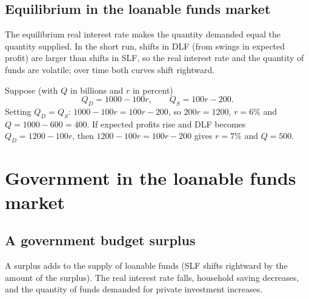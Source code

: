 \subsection{Equilibrium in the loanable funds market}

The equilibrium real interest rate makes the quantity demanded equal the quantity
supplied. In the short run, shifts in DLF (from swings in expected profit) are larger
than shifts in SLF, so the real interest rate and the quantity of funds are volatile; over
time both curves shift rightward.

\begin{example}
Suppose (with $Q$ in billions and $r$ in percent)
\[
  Q_D = 1000 - 100r, \qquad Q_S = 100r - 200.
\]
Setting $Q_D = Q_S$: $1000 - 100r = 100r - 200$, so $200r = 1200$, $r = 6\%$ and
$Q = 1000 - 600 = 400$. If expected profits rise and DLF becomes $Q_D = 1200 - 100r$,
then $1200 - 100r = 100r - 200$ gives $r = 7\%$ and $Q = 500$.
\end{example}

\begin{center}
\end{center}

\section{Government in the loanable funds market}

\subsection{A government budget surplus}

A surplus adds to the supply of loanable funds (SLF shifts rightward by the amount of the
surplus). The real interest rate falls, household saving decreases, and the quantity of
funds demanded for private investment increases.

